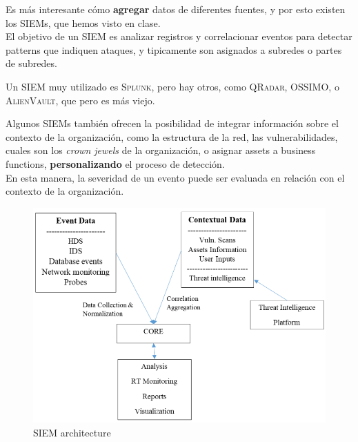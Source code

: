 \begin{paracol}{2}
   \colfill
   Es más interesante cómo \textbf{agregar} datos de diferentes fuentes, y por esto existen los SIEMs, que hemos visto en clase.\\
   El objetivo de un SIEM es analizar registros y correlacionar eventos para detectar patterns que indiquen ataques, y tipicamente son asignados a subredes o partes de subredes.

   Un SIEM muy utilizado es \textsc{Splunk}, pero hay otros, como \textsc{QRadar}, \textsc{OSSIMO}, o \textsc{AlienVault}, que pero es más viejo.
   
   Algunos SIEMs también ofrecen la posibilidad de integrar información sobre el contexto de la organización, como la estructura de la red, las vulnerabilidades, cuales son los \textit{crown jewels} de la organización, o asignar assets a business functions, \textbf{personalizando} el proceso de detección.\\
   En esta manera, la severidad de un evento puede ser evaluada en relación con el contexto de la organización.
   \colfill

   \switchcolumn

   \begin{figure}[htbp]
      \centering
      \includegraphics[width=0.9\columnwidth]{images/06/siem.png}
      \caption{SIEM architecture}
      \label{fig:06/siem}
   \end{figure}
\end{paracol}


